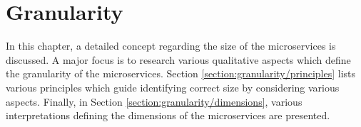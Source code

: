 \chapter{Granularity}\label{chapter:granularity}
In this chapter, a detailed concept regarding the size of the microservices is discussed. A major focus is to research various qualitative aspects which define the granularity of the microservices. Section \ref{section:granularity/principles} lists various principles which guide identifying correct size by considering various aspects. Finally, in Section \ref{section:granularity/dimensions}, various interpretations defining the dimensions of the microservices are presented.


